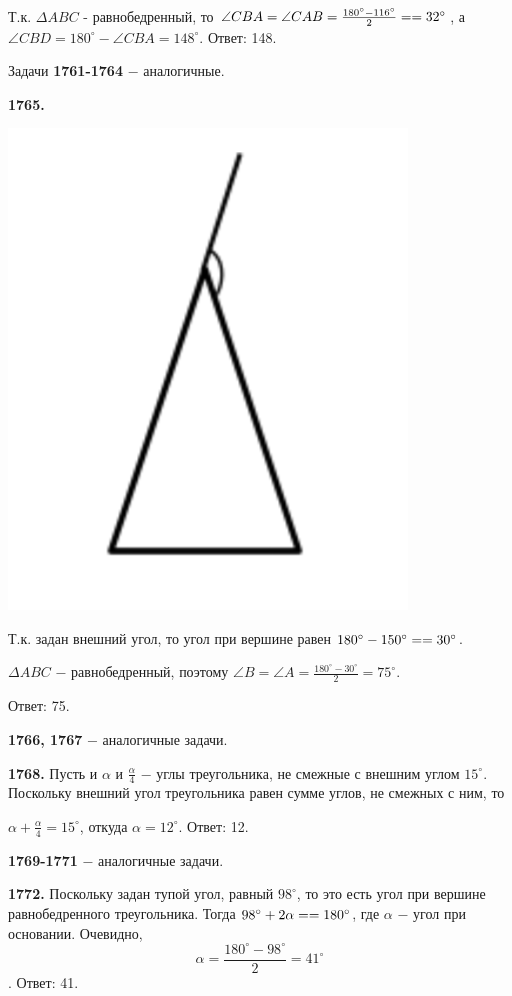Т.к. $\Delta ABC$ - равнобедренный, то $\angle CBA = \angle CAB = \frac{180^\circ - 116^\circ}{2} = \linebreak =32^\circ$, а $\angle CBD = 180^\circ - \angle CBA = 148^\circ.$ \newline \null \hspace*{\fill} Ответ: 148.

Задачи \textbf{1761-1764} $-$ аналогичные.

\textbf{1765.}

{\centering \includegraphics[width=0.3\linewidth]{Geometry/Content/6.png}

}

Т.к. задан внешний угол, то угол при вершине равен $180^\circ - 150^\circ = \linebreak
=30^\circ$.

$\Delta ABC$ $-$ равнобедренный, поэтому $\angle B = \angle A = \frac{180^\circ - 30^\circ}{2} = 75^\circ$.

\null \hspace*{\fill} Ответ: 75.

\textbf{1766, 1767} $-$ аналогичные задачи.

\textbf{1768.} Пусть и $\alpha$ и $\frac{\alpha}{4}$ $-$ углы треугольника, не смежные с внешним углом $15^\circ$. Поскольку внешний угол треугольника равен сумме углов, не смежных с ним, то

{\centering $\alpha + \frac{\alpha}{4} = 15^\circ$, откуда $\alpha =12^\circ$. \newline \null \hspace*{\fill} Ответ: 12.

}

\textbf{1769-1771} $-$ аналогичные задачи.

\textbf{1772.}  Поскольку задан тупой угол, равный $98^\circ$, то это есть угол при вершине равнобедренного треугольника. Тогда  $98^\circ + 2\alpha = \linebreak= 180^\circ$, где $\alpha$ $-$ угол при основании. Очевидно, 
\[
\alpha = \frac{180^\circ - 98^\circ}{2} = 41^\circ
\].\null \hspace*{\fill} Ответ: 41.

